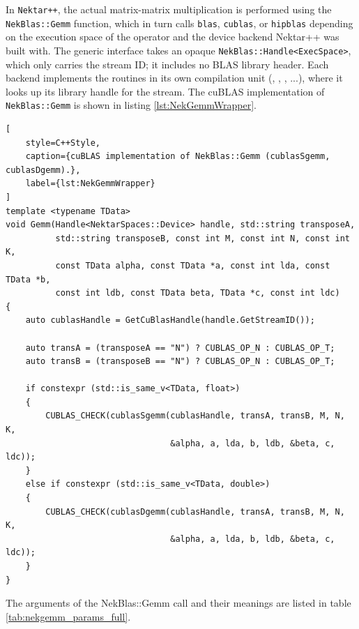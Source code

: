 In \texttt{Nektar++}, the actual matrix-matrix multiplication is performed using the \texttt{NekBlas::Gemm} function, which in turn calls
\texttt{blas}, \texttt{cublas}, or \texttt{hipblas} depending on the execution space of the operator and the device backend Nektar++ was built with.
The generic interface  takes an opaque \texttt{NekBlas::Handle<ExecSpace>}, which only carries the stream ID; it includes no BLAS library header.
Each backend implements the routines in its own compilation unit (, , , ...), where it looks up its library handle for the stream.
The cuBLAS implementation of \texttt{NekBlas::Gemm} is shown in listing \ref{lst:NekGemmWrapper}.
\begin{minipage}{\textwidth}
\begin{lstlisting}[
    style=C++Style,
    caption={cuBLAS implementation of NekBlas::Gemm (cublasSgemm, cublasDgemm).},
    label={lst:NekGemmWrapper}
]
template <typename TData>
void Gemm(Handle<NektarSpaces::Device> handle, std::string transposeA,
          std::string transposeB, const int M, const int N, const int K,
          const TData alpha, const TData *a, const int lda, const TData *b,
          const int ldb, const TData beta, TData *c, const int ldc)
{
    auto cublasHandle = GetCuBlasHandle(handle.GetStreamID());

    auto transA = (transposeA == "N") ? CUBLAS_OP_N : CUBLAS_OP_T;
    auto transB = (transposeB == "N") ? CUBLAS_OP_N : CUBLAS_OP_T;

    if constexpr (std::is_same_v<TData, float>)
    {
        CUBLAS_CHECK(cublasSgemm(cublasHandle, transA, transB, M, N, K,
                                 &alpha, a, lda, b, ldb, &beta, c, ldc));
    }
    else if constexpr (std::is_same_v<TData, double>)
    {
        CUBLAS_CHECK(cublasDgemm(cublasHandle, transA, transB, M, N, K,
                                 &alpha, a, lda, b, ldb, &beta, c, ldc));
    }
}
\end{lstlisting}
\end{minipage}

The arguments of the NekBlas::Gemm call and their meanings are listed in table \ref{tab:nekgemm_params_full}.

